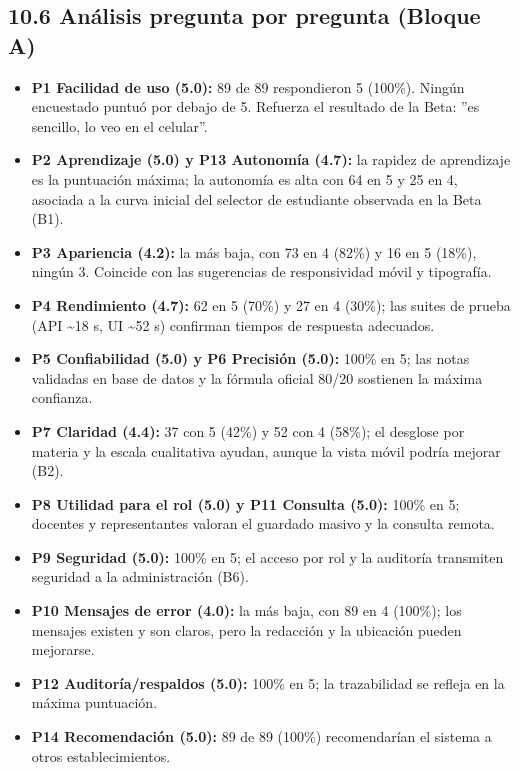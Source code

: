 \documentclass[11pt,a4paper]{article}
\begin{document}
\subsection*{10.6 Análisis pregunta por pregunta (Bloque A)}


\begin{itemize}[leftmargin=*]
\item \textbf{P1 Facilidad de uso (5.0):} 89 de 89 respondieron 5 (100\%). Ningún encuestado puntuó por debajo de 5. Refuerza el resultado de la Beta: ''es sencillo, lo veo en el celular''.
\item \textbf{P2 Aprendizaje (5.0) y P13 Autonomía (4.7):} la rapidez de aprendizaje es la puntuación máxima; la autonomía es alta con 64 en 5 y 25 en 4, asociada a la curva inicial del selector de estudiante observada en la Beta (B1).
\item \textbf{P3 Apariencia (4.2):} la más baja, con 73 en 4 (82\%) y 16 en 5 (18\%), ningún 3. Coincide con las sugerencias de responsividad móvil y tipografía.
\item \textbf{P4 Rendimiento (4.7):} 62 en 5 (70\%) y 27 en 4 (30\%); las suites de prueba (API \textasciitilde{}18 s, UI \textasciitilde{}52 s) confirman tiempos de respuesta adecuados.
\item \textbf{P5 Confiabilidad (5.0) y P6 Precisión (5.0):} 100\% en 5; las notas validadas en base de datos y la fórmula oficial 80/20 sostienen la máxima confianza.
\item \textbf{P7 Claridad (4.4):} 37 con 5 (42\%) y 52 con 4 (58\%); el desglose por materia y la escala cualitativa ayudan, aunque la vista móvil podría mejorar (B2).
\item \textbf{P8 Utilidad para el rol (5.0) y P11 Consulta (5.0):} 100\% en 5; docentes y representantes valoran el guardado masivo y la consulta remota.
\item \textbf{P9 Seguridad (5.0):} 100\% en 5; el acceso por rol y la auditoría transmiten seguridad a la administración (B6).
\item \textbf{P10 Mensajes de error (4.0):} la más baja, con 89 en 4 (100\%); los mensajes existen y son claros, pero la redacción y la ubicación pueden mejorarse.
\item \textbf{P12 Auditoría/respaldos (5.0):} 100\% en 5; la trazabilidad se refleja en la máxima puntuación.
\item \textbf{P14 Recomendación (5.0):} 89 de 89 (100\%) recomendarían el sistema a otros establecimientos.
\end{itemize}
\end{document}

